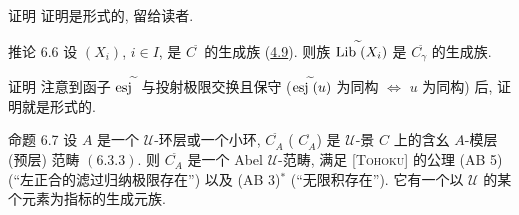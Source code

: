 \begin{enonce*}[remark]{证明}
证明是形式的, 留给读者.
\end{enonce*}

\begin{enonce*}{推论 6.6}
设 $(X_i)$, $i\in I$,
是 $C^{\widetilde{\phantom{,}}}$ 的生成族
(\hyperref[II.subsec4.9]{4.9}).
则族 $\operatorname{Lib}^{\widetilde{\phantom{,}}}(X_i)$
是 $C^{\widetilde{\phantom{,}}}_{\gamma}$ 的生成族.
\end{enonce*}

\begin{enonce*}[remark]{证明}
注意到函子 $\operatorname{esj}^{\widetilde{\phantom{,}}}$
与投射极限交换且保守
($\operatorname{esj}^{\widetilde{\phantom{,}}}(u)$ 为同构
$\Leftrightarrow$ $u$ 为同构) 后, 证明就是形式的.
\end{enonce*}

\begin{enonce*}{命题 6.7}
设 $A$ 是一个 $𝒰$-环层或一个小环,
$C^{\widetilde{\phantom{,}}}_A$ (\resp
$C^{\widehat{\phantom{,}}}_A$)
是 $𝒰$-景 $C$ 上的含幺 $A$-模层
(\resp 预层) 范畴 $(\hyperref[II.subsubsec6.3.3]{6.3.3})$.
则 $C^{\widetilde{\phantom{,}}}_A$ 是一个 Abel $𝒰$-范畴,
满足 {\rm[\textsc{Tohoku}]} 的公理
{\rm (AB 5)} (“左正合的滤过归纳极限存在”)
以及 {\rm (AB 3)$^{\ast}$} (“无限积存在”).
它有一个以 $𝒰$ 的某个元素为指标的生成元族.
\end{enonce*}

